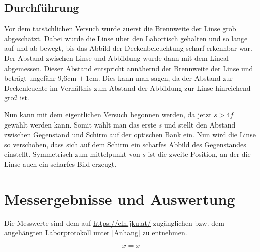 \documentclass[a4paper,12pt]{article}
\begin{document}
\subsection{Durchführung}

Vor dem tatsächlichen Versuch wurde zuerst die Brennweite der Linse grob abgeschätzt.
Dabei wurde die Linse über den Labortisch gehalten und so lange auf und ab bewegt, bis das
Abbild der Deckenbeleuchtung scharf erkennbar war. Der Abstand zwischen Linse und Abbildung
wurde dann mit dem Lineal abgemessen. Dieser Abstand entspricht annähernd der Brennweite
der Linse und beträgt ungefähr 9,6cm $\pm\:1\mathrm{cm}$. Dies kann man sagen, da der Abstand
zur Deckenleuchte im Verhältnis zum Abstand der Abbildung zur Linse hinreichend groß ist.

Nun kann mit dem eigentlichen Versuch begonnen werden, da jetzt $s>4f$ gewählt werden kann.
Somit wählt man das erste $s$ und stellt den Abstand zwischen Gegenstand und Schirm auf der
optischen Bank ein. Nun wird die Linse so verschoben, dass sich auf dem Schirm ein scharfes
Abbild des Gegenstandes einstellt. Symmetrisch zum mittelpunkt von $s$ ist die zweite Position,
an der die Linse auch ein scharfes Bild erzeugt. 


\section{Messergebnisse und Auswertung}

Die Messwerte sind dem auf \url{https://eln.jku.at/} zugänglichen bzw. dem angehängten Laborprotokoll unter \ref{Anhang} zu entnehmen.         %


\begin{equation}
    \label{Gl1}
    x = x
\end{equation}

\vspace{0,5cm}
\end{document}
